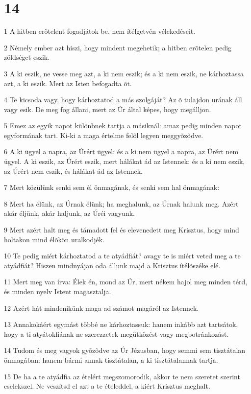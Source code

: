 \chapter{14}

\par 1 A hitben erõtelent fogadjátok be, nem ítélgetvén vélekedéseit.
\par 2 Némely ember azt hiszi, hogy mindent megehetik; a hitben erõtelen pedig zöldséget eszik.
\par 3 A ki eszik, ne vesse meg azt, a ki nem eszik; és a ki nem eszik, ne kárhoztassa azt, a ki eszik. Mert az Isten befogadta õt.
\par 4 Te kicsoda vagy, hogy kárhoztatod a más szolgáját? Az õ tulajdon urának áll vagy esik. De meg fog állani, mert az Úr által képes, hogy megálljon.
\par 5 Emez az egyik napot különbnek tartja a másiknál: amaz pedig minden napot egyformának tart. Ki-ki a maga értelme felõl legyen meggyõzõdve.
\par 6 A ki ügyel a napra, az Úrért ügyel: és a ki nem ügyel a napra, az Úrért nem ügyel. A ki eszik, az Úrért eszik, mert hálákat ád az Istennek: és a ki nem eszik, az Úrért nem eszik, és hálákat ád az Istennek.
\par 7 Mert közülünk senki sem él önmagának, és senki sem hal önmagának:
\par 8 Mert ha élünk, az Úrnak élünk; ha meghalunk, az Úrnak halunk meg. Azért akár éljünk, akár haljunk, az Úréi vagyunk.
\par 9 Mert azért halt meg és támadott fel és elevenedett meg Krisztus, hogy mind holtakon mind élõkön uralkodjék.
\par 10 Te pedig miért kárhoztatod a te atyádfiát? avagy te is miért veted meg a te atyádfiát? Hiszen mindnyájan oda állunk majd a Krisztus ítélõszéke elé.
\par 11 Mert meg van írva: Élek én, mond az Úr, mert nékem hajol meg minden térd, és minden nyelv Istent magasztalja.
\par 12 Azért hát mindenikünk maga ad számot magáról az Istennek.
\par 13 Annakokáért egymást többé ne kárhoztassuk: hanem inkább azt tartsátok, hogy a ti atyátokfiának ne szerezzetek megütközést vagy megbotránkozást.
\par 14 Tudom és meg vagyok gyõzõdve az Úr Jézusban, hogy semmi sem tisztátalan önmagában: hanem bármi annak tisztátalan, a ki tisztátalannak tartja.
\par 15 De ha a te atyádfia az ételért megszomorodik, akkor te nem szeretet szerint cselekszel. Ne veszítsd el azt a te ételeddel, a kiért Krisztus meghalt.
